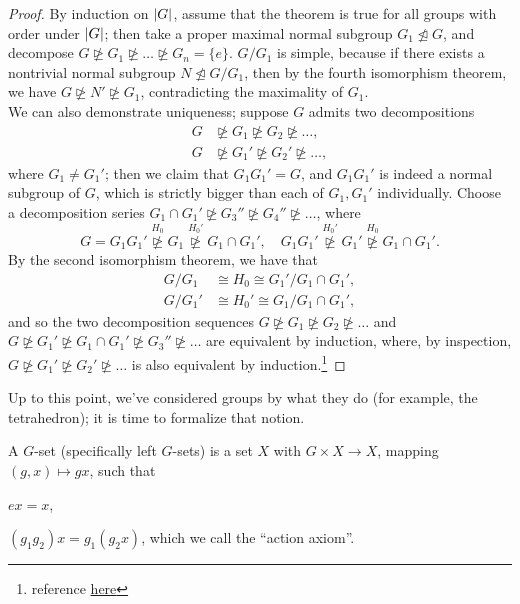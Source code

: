 \begin{proof}
    By induction on $\left\lvert G \right\rvert$, assume that the theorem is true for all groups with order under $\left\lvert G \right\rvert$; then take a proper maximal normal subgroup $G_1 \nunlhd G$, and decompose $G \nunrhd G_1 \nunrhd \dots \nunrhd G_n = \{e\}$. $G/G_1$ is simple, because if there exists a nontrivial normal subgroup $N \nunlhd G/G_1$, then by the fourth isomorphism theorem, we have $G \nunrhd N' \nunrhd G_1$, contradicting the maximality of $G_1$.
    \\[8pt]
    We can also demonstrate uniqueness; suppose $G$ admits two decompositions
    \begin{align*}
        G &\nunrhd G_1 \nunrhd G_2 \nunrhd \dots, \\
        G &\nunrhd G_1' \nunrhd G_2' \nunrhd \dots,
    \end{align*}
    where $G_1 \neq G_1'$; then we claim that $G_1 G_1' = G$, and $G_1 G_1'$ is indeed a normal subgroup of $G$, which is strictly bigger than each of $G_1, G_1'$ individually. Choose a decomposition series $G_1 \cap G_1' \nunrhd G_3'' \nunrhd G_4'' \nunrhd \dots$, where
    \[ G = G_1 G_1' \stackrel{H_0}{\nunrhd} G_1 \stackrel{H_0'}{\nunrhd} G_1 \cap G_1', \quad G_1 G_1' \stackrel{H_0'}{\nunrhd} G_1' \stackrel{H_0}{\nunrhd} G_1 \cap G_1'. \]
    By the second isomorphism theorem, we have that
    \begin{align*}
        G/G_1 &\cong H_0 \cong G_1' / G_1 \cap G_1', \\
        G/G_1' &\cong H_0' \cong G_1 / G_1 \cap G_1',
    \end{align*}
    and so the two decomposition sequences $G \nunrhd G_1 \nunrhd G_2 \nunrhd \dots$ and $G \nunrhd G_1' \nunrhd G_1 \cap G_1' \nunrhd G_3'' \nunrhd \dots$ are equivalent by induction, where, by inspection, $G \nunrhd G_1' \nunrhd G_2' \nunrhd \dots$ is also equivalent by induction.\footnote{reference \href{https://planetmath.org/proofofthejordanholderdecompositiontheorem}{here}}
\end{proof}
\newpage
\noindent Up to this point, we've considered groups by what they do (for example, the tetrahedron); it is time to formalize that notion.
\begin{definition}[$G$-sets]
    A $G$-set (specifically left $G$-sets) is a set $X$ with $G \times X \to X$, mapping $(g, x) \mapsto gx$, such that \begin{parlist} \item $ex = x$, \item $(g_1 g_2) x = g_1 (g_2 x)$, which we call the ``action axiom''. \end{parlist}
\end{definition}
